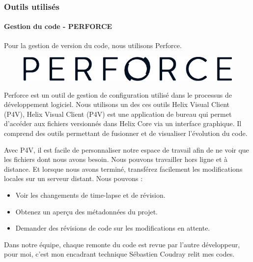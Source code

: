 \documentclass[12pt]{article}
\begin{document}
    

    \subsubsection{Outils utilisés}
        \paragraph{Gestion du code - PERFORCE}
            \par Pour la gestion de version du code, nous utilisons Perforce.
            \begin{figure}[H]
                \flushleft
                \includegraphics[width=.3\textwidth]{Perforce_Logo.jpg}
                \label{fig:Perforce_Logo}
            \end{figure}
            \par Perforce est un outil de gestion de configuration utilisé dans le processus de développement logiciel. Nous utilisons un des ces outils Helix Visual Client (P4V), Helix Visual Client (P4V) est une application de bureau qui permet d’accéder aux fichiers versionnés dans Helix Core via un interface graphique. Il comprend des outils permettant de fusionner et de visualiser l'évolution du code.
            \par Avec P4V, il est facile de personnaliser notre espace de travail afin de ne voir que les fichiers dont nous avons besoin. Nous pouvons travailler hors ligne et à distance. Et lorsque nous avons terminé, transférez facilement les modifications locales sur un serveur distant. 
            \newline 
            Nous pouvons : \newline
            \begin{itemize}
                \item Voir les changements de time-lapse et de révision. 
                \item Obtenez un aperçu des métadonnées du projet.
                \item Demander des révisions de code sur les modifications en attente.
            \end{itemize} 
            \par Dans notre équipe, chaque remonte du code est revue par l'autre développeur, pour moi, c'est mon encadrant technique Sébastien Coudray relit mes codes. 
\end{document}

